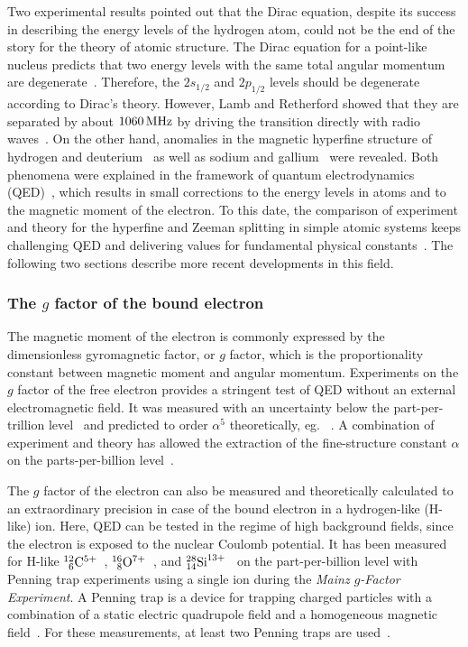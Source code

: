 Two experimental results pointed out that the Dirac equation, despite its success in describing the energy levels of the hydrogen atom, could not be the end of the story for the theory of atomic structure. 
The Dirac equation for a point-like nucleus predicts that two energy levels with the same total angular momentum are degenerate~\cite{greiner2000}. Therefore, the $2s_{1/2}$ and $2p_{1/2}$ levels should be degenerate according to Dirac's theory. However, Lamb and Retherford showed that they are separated by about $1060\,\rm{MHz}$ by driving the transition directly with radio waves~\cite{lamb1947}. On the other hand, anomalies in the magnetic hyperfine structure of hydrogen and deuterium~\cite{nafe1947} as well as sodium and gallium~\cite{kusch1947,kusch1948} were revealed. Both phenomena were explained in the framework of quantum electrodynamics (QED)~\cite{schwinger1948}, which results in small corrections to the energy levels in atoms and to the magnetic moment of the electron. To this date, the comparison of experiment and theory for the hyperfine and Zeeman splitting in simple atomic systems keeps challenging QED and delivering values for fundamental physical constants~\cite{haensch1979}. The following two sections describe more recent developments in this field.

\subsubsection*{The $g$ factor of the bound electron}
The magnetic moment of the electron is commonly expressed by the dimensionless gyromagnetic factor, or $g$ factor, which is the proportionality constant between magnetic moment and angular momentum. Experiments on the $g$ factor of the free electron provides a stringent test of QED without an external electromagnetic field. It was measured with an uncertainty below the part-per-trillion level~\cite{odom2006,hanneke2008} and predicted to order $\alpha^5$ theoretically, eg.~  \cite{schwinger1948,Peterman57,Sommerfield1957,Sommerfield58,Laporta96,kinoshita2006,aoyama2007,aoyama2015,aoyama2017}. A combination of experiment and theory has allowed the extraction of the fine-structure constant $\alpha$ on the parts-per-billion level~\cite{gabrielse2006,gabrielse2007}.

The $g$ factor of the electron can also be measured and theoretically calculated to an extraordinary precision in case of the bound electron in a hydrogen-like (H-like) ion. Here, QED can be tested in the regime of high background fields, since the electron is exposed to the nuclear Coulomb potential. It has been measured for H-like $^{12}_{\phantom{0}6}\rm{C}^{5+}$~\cite{Haffner2000,Sturm2014}, $^{16}_{\phantom{0}8}\rm{O}^{7+}$~\cite{Verdu2004}, and $^{28}_{14}\rm{Si}^{13+}$~\cite{Sturm2011} on the part-per-billion level with Penning trap experiments using a single ion during the \textit{Mainz $g$-Factor Experiment}. A Penning trap is a device for trapping charged particles with a combination of a static electric quadrupole field and a homogeneous magnetic field~\cite{geoniumtheory}. For these measurements, at least two Penning traps are used~\cite{annphysgfactor}.

